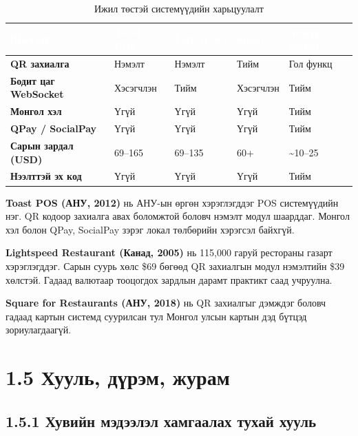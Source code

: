 \begin{table}[htbp]
\caption{Ижил төстэй системүүдийн харьцуулалт}
\label{tab:compare}
\centering
\begin{tabularx}{\textwidth}{|>{\bfseries}X|Z|Z|Z|Z|}
\hline
{}\textcolor{white}{\textbf{Шалгуур}}
  & \textcolor{white}{\textbf{Toast POS}}
  & \textcolor{white}{\textbf{Lightspeed}}
  & \textcolor{white}{\textbf{Square}}
  & \textcolor{white}{\textbf{Энэхүү систем}} \\ \hline
QR захиалга          & Нэмэлт    & Нэмэлт    & Тийм      & Гол функц \\ \hline
Бодит цаг WebSocket  & Хэсэгчлэн & Тийм      & Хэсэгчлэн & Тийм \\ \hline
Монгол хэл           & Үгүй      & Үгүй      & Үгүй      & Тийм \\ \hline
QPay / SocialPay     & Үгүй      & Үгүй      & Үгүй      & Тийм \\ \hline
Сарын зардал (USD)   & 69--165   & 69--135   & 60+       & \textasciitilde10--25 \\ \hline
Нээлттэй эх код      & Үгүй      & Үгүй      & Үгүй      & Тийм \\ \hline
\end{tabularx}
\end{table}

\textbf{Toast POS (АНУ, 2012)} нь АНУ-ын өргөн хэрэглэгддэг POS системүүдийн нэг.
QR кодоор захиалга авах боломжтой боловч нэмэлт модул шаарддаг. Монгол хэл болон
QPay, SocialPay зэрэг локал төлбөрийн хэрэгсэл байхгүй.

\textbf{Lightspeed Restaurant (Канад, 2005)} нь 115,000 гаруй рестораны газарт
хэрэглэгддэг. Сарын суурь хөлс \$69 бөгөөд QR захиалгын модул нэмэлтийн \$39
хөлстэй. Гадаад валютаар тооцогдох зардлын дарамт практикт саад учруулна.

\textbf{Square for Restaurants (АНУ, 2018)} нь QR захиалгыг дэмждэг боловч
гадаад картын системд суурилсан тул Монгол улсын картын дэд бүтцэд зориулагдаагүй.

\section{1.5 Хууль, дүрэм, журам}

\subsection{1.5.1 Хувийн мэдээлэл хамгаалах тухай хууль}

